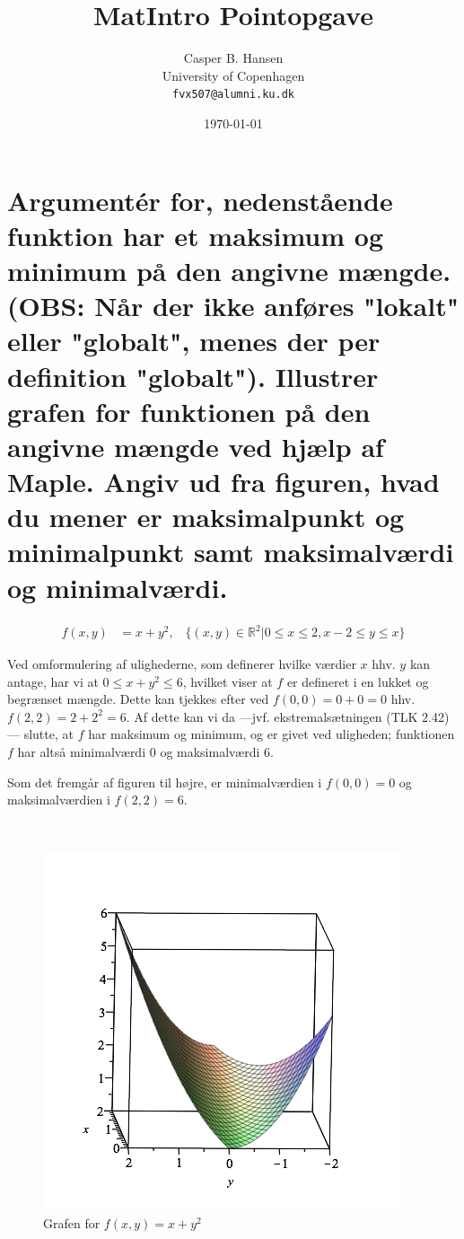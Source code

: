 \documentclass[11pt,a4paper]{article}
\title{MatIntro Pointopgave \assignmentnumber}
\author
{
    Casper B. Hansen\\
    University of Copenhagen\\
    {\tt fvx507@alumni.ku.dk}
}
\date{\today}
\newcommand{\colbreak}{\vfill{\ }\columnbreak}
\begin{document}


\section
{
    \mdseries
    Argumentér for, nedenstående funktion har et maksimum og minimum på den
    angivne mængde. (OBS: Når der ikke anføres "lokalt" eller "globalt", menes
    der per definition "globalt"). Illustrer grafen for funktionen på den
    angivne mængde ved hjælp af Maple. Angiv ud fra figuren, hvad du mener er
    maksimalpunkt og minimalpunkt samt maksimalværdi og minimalværdi.
}
\begin{align}
    f(x,y) &= x + y^2
    \text{,}\quad
    \{(x,y) \in \mathbb{R}^2 | 0 \leq x \leq 2, x - 2 \leq y \leq x\}
\end{align}

\begin{multicols}{2}
    Ved omformulering af ulighederne, som definerer hvilke værdier $x$ hhv. $y$
    kan antage, har vi at $0 \leq x + y^2 \leq 6$, hvilket viser at $f$ er
    defineret i en lukket og begrænset mængde. Dette kan tjekkes efter ved
    $f(0,0) = 0 + 0 = 0$ hhv. $f(2, 2) = 2 + 2^2 = 6$. Af dette kan vi da
    ---jvf. ekstremalsætningen (TLK 2.42)--- slutte, at $f$ har maksimum og
    minimum, og er givet ved uligheden; funktionen $f$ har altså minimalværdi
    $0$ og maksimalværdi $6$.

    Som det fremgår af figuren til højre, er minimalværdien i $f(0,0) = 0$ og
    maksimalværdien i $f(2,2) = 6$.

    \vfill{\ }\colbreak

    \begin{figure}[H]
        \centering
        \includegraphics[scale=0.4]{figures/7-1.png}
        \caption{Grafen for $f(x,y) = x + y^2$}
        \label{fig:7-1}
    \end{figure}

\end{multicols}
\end{document}
